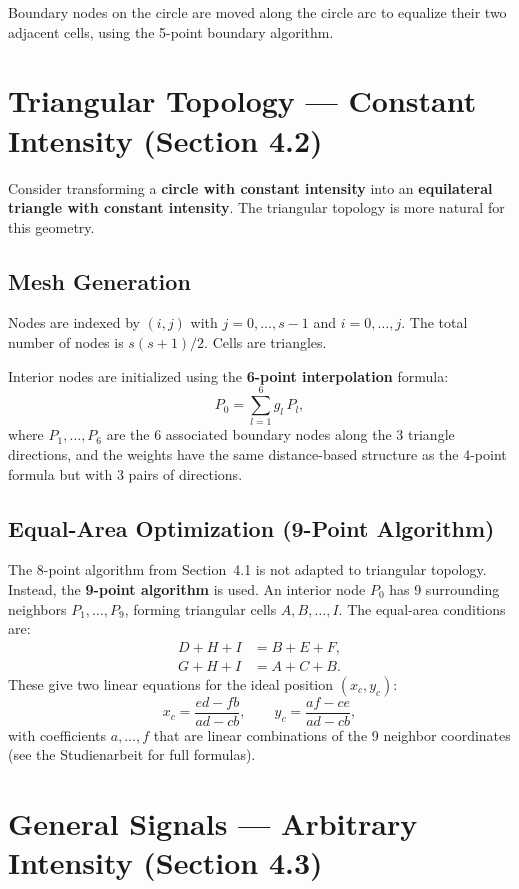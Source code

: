 \documentclass[11pt,a4paper]{article}
\begin{document}
Boundary nodes on the circle are moved along the circle arc to equalize their 
two adjacent cells, using the 5-point boundary algorithm.

\section{Triangular Topology --- Constant Intensity (Section 4.2)}

Consider transforming a \textbf{circle with constant intensity} into an 
\textbf{equilateral triangle with constant intensity}. 
The triangular topology is more natural for this geometry.

\subsection{Mesh Generation}

Nodes are indexed by $(i,j)$ with $j = 0,\ldots,s{-}1$ and $i = 0,\ldots,j$. 
The total number of nodes is $s(s{+}1)/2$. Cells are triangles.

Interior nodes are initialized using the \textbf{6-point interpolation} formula:
\[
  P_0 = \sum_{l=1}^{6} g_l\, P_l,
\]
where $P_1,\ldots,P_6$ are the 6 associated boundary nodes along the 3 triangle 
directions, and the weights have the same distance-based structure as the 4-point 
formula but with 3 pairs of directions.

\subsection{Equal-Area Optimization (9-Point Algorithm)}

The 8-point algorithm from Section~4.1 is not adapted to triangular topology.
Instead, the \textbf{9-point algorithm} is used. An interior node $P_0$ has 
9 surrounding neighbors $P_1,\ldots,P_9$, forming triangular cells $A,B,\ldots,I$.
The equal-area conditions are:
\begin{align}
  D + H + I &= B + E + F, \\
  G + H + I &= A + C + B.
\end{align}
These give two linear equations for the ideal position $(x_c, y_c)$:
\[
  x_c = \frac{ed - fb}{ad - cb}, \qquad y_c = \frac{af - ce}{ad - cb},
\]
with coefficients $a,\ldots,f$ that are linear combinations of the 9 neighbor 
coordinates (see the Studienarbeit for full formulas).

\section{General Signals --- Arbitrary Intensity (Section 4.3)}
\end{document}
